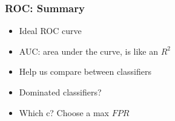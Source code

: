 \documentclass[
  shownotes,
  xcolor={svgnames},
  hyperref={colorlinks,citecolor=DarkBlue,linkcolor=DarkRed,urlcolor=DarkBlue}
  , aspectratio=169]{beamer}
\begin{document}
\begin{frame}[fragile]
\frametitle{ROC: Summary}

\begin{itemize}
  \item Ideal ROC curve
  \medskip
  \item AUC: area under the curve, is like an $R^2$
  \medskip
  \item Help us compare between classifiers
  \medskip
  \item Dominated classifiers?
  \medskip
  \item Which c? Choose a max $FPR$

\end{itemize}

\end{frame}
\end{document}
